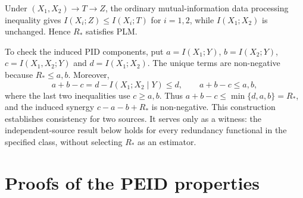 {Under $(X_1,X_2)\rightarrow T\rightarrow Z$, the ordinary mutual-information data processing inequality gives $I(X_i;Z)\leq I(X_i;T)$ for $i=1,2$, while $I(X_1;X_2)$ is unchanged. Hence $R_*$ satisfies PLM.

To check the induced PID components, put $a=I(X_1;Y)$, $b=I(X_2;Y)$, $c=I(X_1,X_2;Y)$ and $d=I(X_1;X_2)$. The unique terms are non-negative because $R_*\leq a,b$. Moreover,
\begin{equation}
a+b-c=d-I(X_1;X_2\mid Y)\leq d,
\qquad a+b-c\leq a,b,
\label{eq:pid_witness_lower_bound}
\end{equation}
where the last two inequalities use $c\geq a,b$. Thus $a+b-c\leq\min\{d,a,b\}=R_*$, and the induced synergy $c-a-b+R_*$ is non-negative. This construction establishes consistency for two sources. It serves only as a witness: the independent-source result below holds for every redundancy functional in the specified class, without selecting $R_*$ as an estimator.
}

\section{Proofs of the PEID properties}
\label{app:theoretical_proofs}

